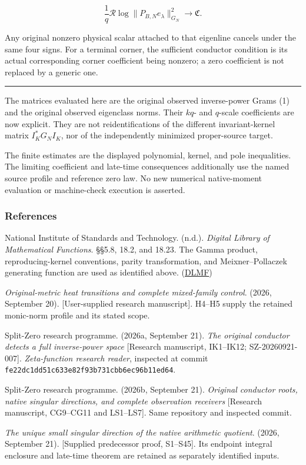\documentclass[11pt]{article}
\begin{document}
\[
\boxed{
\frac1q\mathcal R
\log\|P_{B,N}e_\lambda\|_{G_N}^2
\longrightarrow\mathfrak C.
}
\tag{56}
\]

Any original nonzero physical scalar attached to that eigenline cancels under the same four signs. For a terminal corner, the sufficient conductor condition is its actual corresponding corner coefficient being nonzero; a zero coefficient is not replaced by a generic one.

\begin{center}\rule{0.5\linewidth}{0.5pt}\end{center}

The matrices evaluated here are the original observed inverse-power Grams (1) and the original observed eigenclass norms. Their \(kq\)- and \(q\)-scale coefficients are now explicit. They are not reidentifications of the different invariant-kernel matrix \(I_K^*G_NI_K\), nor of the independently minimized proper-source target.

The finite estimates are the displayed polynomial, kernel, and pole inequalities. The limiting coefficient and late-time consequences additionally use the named source profile and reference zero law. No new numerical native-moment evaluation or machine-check execution is asserted.

\subsubsection{References}\label{references}

National Institute of Standards and Technology. (n.d.). \emph{Digital Library of Mathematical Functions}. §§5.8, 18.2, and 18.23. The Gamma product, reproducing-kernel conventions, parity transformation, and Meixner--Pollaczek generating function are used as identified above. (\href{https://dlmf.nist.gov/5.8}{DLMF})

\emph{Original-metric heat transitions and complete mixed-family control}. (2026, September 20). {[}User-supplied research manuscript{]}. H4--H5 supply the retained monic-norm profile and its stated scope.

Split-Zero research programme. (2026a, September 21). \emph{The original conductor detects a full inverse-power space} {[}Research manuscript, IK1--IK12; SZ-20260921-007{]}. \emph{Zeta-function research reader}, inspected at commit \nolinkurl{fe22dc1dd51c633e82f93b731cbb6ec96b11ed64}.

Split-Zero research programme. (2026b, September 21). \emph{Original conductor roots, native singular directions, and complete observation receivers} {[}Research manuscript, CG9--CG11 and LS1--LS7{]}. Same repository and inspected commit.

\emph{The unique small singular direction of the native arithmetic quotient}. (2026, September 21). {[}Supplied predecessor proof, S1--S45{]}. Its endpoint integral enclosure and late-time theorem are retained as separately identified inputs.
\end{document}
